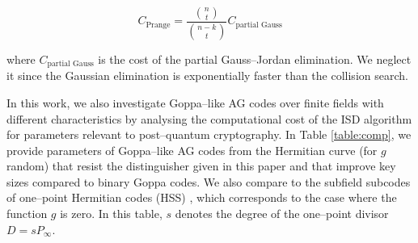 \documentclass[peerreview]{IEEEtran}
\theoremstyle{plain}
\theoremstyle{definition}
\theoremstyle{remark}
\begin{document}
	$$ C_\text{Prange}= \frac{\binom{n}{t}}{\binom{n-k}{t}}C_\text{partial Gauss}$$
	
	where $C_\text{partial Gauss}$ is the cost of the partial Gauss--Jordan elimination. We neglect it since the
	Gaussian elimination is exponentially faster than the collision search. %
	
	In this work, we also investigate Goppa--like AG codes over finite fields with different characteristics by analysing the computational cost of the ISD algorithm for parameters relevant to post--quantum cryptography. In Table \ref{table:comp}, we provide parameters of Goppa--like AG codes from the Hermitian curve (for $g$ random) that resist the distinguisher given in this paper and that improve key sizes compared to binary Goppa codes. We also compare to the subfield subcodes of one--point Hermitian codes (HSS) \cite[Tables~2 and 3]{EKN21crypto}, which corresponds to the case where the function $g$ is zero. In this table, $s$ denotes the degree of the one--point divisor $D=sP_\infty$. 
	\setlength\tabcolsep{5pt}
	\setlength\extrarowheight{3pt}
	
\end{document}
